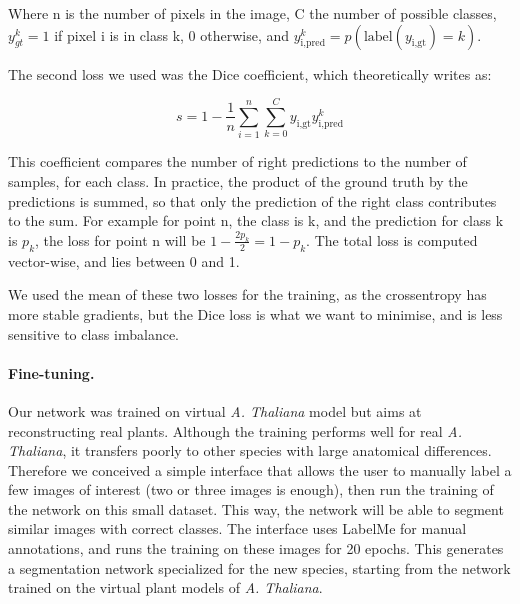 Where n is the number of pixels in the image, C the number of possible
classes, $y_{gt}^k = 1$ if pixel i is in class k, 0 otherwise, and
$y_ {\textrm{i}, \textrm{pred}}^k = p(\textrm{label}(y_{\textrm{i},
\textrm{gt}}) = k)$.

The second loss we used was the Dice coefficient, which theoretically
writes as:

\begin{equation}
    s = 1 - \frac{1}{n}\sum_{i=1}^n\sum_{k=0}^{C}y_{\textrm{i},
    \textrm{gt}} y_{\textrm{i}, \textrm{pred}}^k
\end{equation}


This coefficient compares the number of right predictions to the
number of samples, for each class. In practice, the product of the
ground truth by the predictions is summed, so that only the prediction
of the right class contributes to the sum. For example for point n,
the class is k, and the prediction for class k is $p_k$, the loss
for point n will be $1 - \frac{2p_k}{2} = 1 - p_k$. The total loss
is computed vector-wise, and lies between 0 and 1.


We used the mean of these two losses for the training, as the
crossentropy has more stable gradients, but the Dice loss is what we
want to minimise, and is less sensitive to class imbalance.


\paragraph{Fine-tuning.} Our network was trained on virtual \emph{A.
Thaliana} model but aims at reconstructing real plants. Although the training performs well for real \emph{A. Thaliana}, it transfers poorly to other species with large anatomical differences. Therefore we
conceived a simple interface that allows the user to manually label a
few images of interest (two or three images is enough), then run the training
of the network on this small dataset. This way, the network will be
able to segment similar images with correct classes.
The interface uses LabelMe \cite{russell_labelme:_2008} for manual annotations, and runs the training on these images for 20 epochs. This generates a segmentation network specialized for the new species, starting from the network trained on the virtual plant models of \emph{A. Thaliana}.

